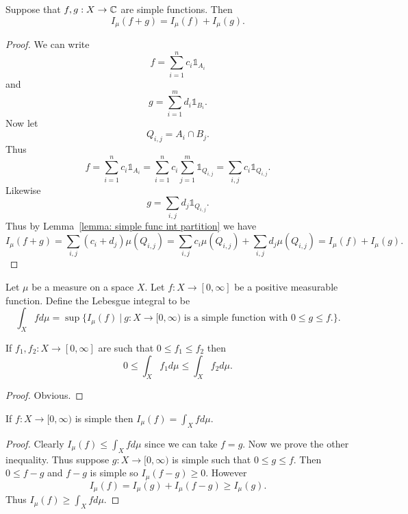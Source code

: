 \documentclass[twoside, a4paper, 10pt]{amsart}
\begin{document}
\begin{lemma}\label{lemma: I additive} Suppose that $f,g:X \to \mathbb{C}$ are simple functions. Then $$I_{\mu}(f+g) = I_{\mu}(f) + I_{\mu}(g).$$

\end{lemma}

\begin{proof} We can write $$f = \sum_{i=1}^n c_i \mathds{1}_{A_i}$$ and $$g = \sum_{i=1}^m d_i \mathds{1}_{B_i}.$$ Now let $$Q_{i,j} = A_i \cap B_j.$$ Thus $$f = \sum_{i=1}^nc_i\mathds{1}_{A_i} = \sum_{i=1}^n c_i\sum_{j=1}^m \mathds{1}_{Q_{i,j}} = \sum_{i,j} c_i \mathds{1}_{Q_{i,j}}.$$ Likewise $$g = \sum_{i,j} d_j \mathds{1}_{Q_{i,j}}.$$ Thus by Lemma~\ref{lemma: simple func int partition} we have $$I_{\mu}(f+g) = \sum_{i,j} (c_i + d_j) \mu(Q_{i,j}) =  \sum_{i,j} c_i \mu(Q_{i,j}) + \sum_{i,j} d_j \mu(Q_{i,j}) = I_{\mu}(f) + I_{\mu}(g).   $$

\end{proof}

\begin{mydef} Let $\mu$ be a measure on a space $X$. Let $f:X \to [0, \infty]$ be a positive measurable function. Define the Lebesgue integral to be $$\int_{X} f d\mu = \sup \{ I_{\mu}(f) ~|~ g:X \to [0,\infty) \text{ is a simple function with } 0 \leq g \leq f. \}.$$

\end{mydef}

\begin{lemma} If $f_1,f_2:X \to [0,\infty]$ are such that $0 \leq f_1 \leq f_2$ then $$0 \leq \int_X f_1 d\mu \leq \int_X f_2 d\mu.$$

\end{lemma}

\begin{proof} Obvious. \end{proof}

\begin{lemma}\label{lemma: I is int} If $f:X \to [0,\infty)$ is simple then $I_{\mu}(f) = \int_X f d\mu$. \end{lemma}
\begin{proof} Clearly $I_{\mu}(f) \leq \int_X f d\mu$ since we can take $f=g$. Now we prove the other inequality. Thus suppose $g:X \to [0,\infty) $ is simple such that $0 \leq g \leq f$. Then $0 \leq f-g$ and $f-g$ is simple so $I_{\mu}(f-g) \geq 0$. However $$I_{\mu}(f) = I_{\mu}(g) + I_{\mu}(f-g) \geq I_{\mu}(g).$$ Thus $I_{\mu}(f) \geq \int_X f d\mu$. \end{proof}
\end{document}
